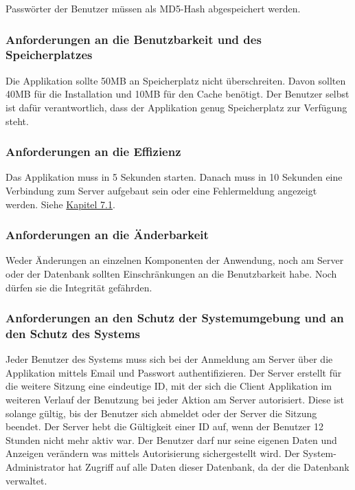 \documentclass[a4paper,12pt,oneside]{scrartcl}
\begin{document}
Passwörter der Benutzer müssen als MD5-Hash abgespeichert werden.


\subsubsection{Anforderungen an die Benutzbarkeit und des Speicherplatzes}
Die Applikation sollte 50MB an Speicherplatz nicht überschreiten.
Davon sollten 40MB für die Installation und 10MB für den Cache benötigt.
Der Benutzer selbst ist dafür verantwortlich, dass der Applikation genug Speicherplatz zur Verfügung steht. 


\subsubsection{Anforderungen an die Effizienz}
Das Applikation muss in 5 Sekunden starten.
Danach muss in 10 Sekunden eine Verbindung zum Server aufgebaut sein oder eine Fehlermeldung angezeigt werden.
Siehe \hyperlink{s07}{Kapitel 7.1}.


\subsubsection{Anforderungen an die Änderbarkeit}
Weder Änderungen an einzelnen Komponenten der Anwendung, noch am Server oder der Datenbank sollten Einschränkungen an die Benutzbarkeit habe.
Noch dürfen sie die Integrität gefährden.


\subsubsection{Anforderungen an den Schutz der Systemumgebung und an den Schutz des Systems}
Jeder Benutzer des Systems muss sich bei der Anmeldung am Server über die Applikation mittels Email und Passwort authentifizieren.
Der Server erstellt für die weitere Sitzung eine eindeutige ID, mit der sich die Client Applikation im weiteren Verlauf der Benutzung bei jeder Aktion am Server autorisiert.
Diese ist solange gültig, bis der Benutzer sich abmeldet oder der Server die Sitzung beendet.
Der Server hebt die Gültigkeit einer ID auf, wenn der Benutzer 12 Stunden nicht mehr aktiv war.
Der Benutzer darf nur seine eigenen Daten und Anzeigen verändern was mittels Autorisierung sichergestellt wird.
Der System-Administrator hat Zugriff auf alle Daten dieser Datenbank, da der die Datenbank verwaltet. 
\end{document}
